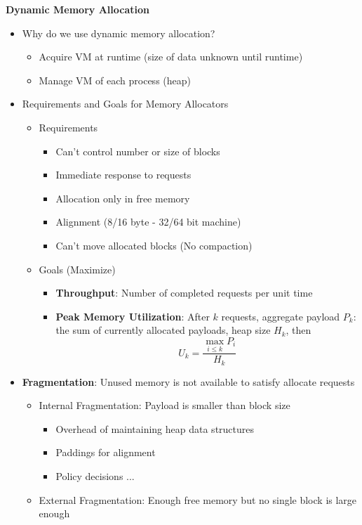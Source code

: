 \documentclass[12pt]{article}
\newcommand{\cname}[1]{\large \textbf{#1}}
\begin{document}
{\pagebreak
\cname{Dynamic Memory Allocation}
\begin{itemize}
	\item Why do we use dynamic memory allocation?
	\begin{itemize}
		\item Acquire VM at runtime (size of data unknown until runtime)
		\item Manage VM of each process (heap)
	\end{itemize}
	\item Requirements and Goals for Memory Allocators
	\begin{itemize}
		\item Requirements
		\begin{itemize}
			\item Can't control number or size of blocks
			\item Immediate response to requests
			\item Allocation only in free memory
			\item Alignment (8/16 byte - 32/64 bit machine)
			\item Can't move allocated blocks (No compaction)
		\end{itemize}
		\item Goals (Maximize)
		\begin{itemize}
			\item \textbf{Throughput}: Number of completed requests per unit time
			\item \textbf{Peak Memory Utilization}: After $k$ requests, aggregate payload $P_k$: the sum of currently allocated payloads, heap size $H_k$, then $$U_k = \frac{\max_{i\leq k} P_i}{H_k}$$
		\end{itemize}
	\end{itemize}
	\item \textbf{Fragmentation}: Unused memory is not available to satisfy allocate requests
	\begin{itemize}
		\item Internal Fragmentation: Payload is smaller than block size
		\begin{itemize}
			\item Overhead of maintaining heap data structures
			\item Paddings for alignment
			\item Policy decisions ...
		\end{itemize}
		\item External Fragmentation: Enough free memory but no single block is large enough
		\begin{itemize}

\end{itemize}
\end{itemize}
\end{itemize}}
\end{document}
